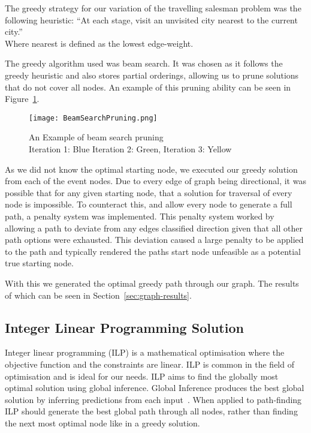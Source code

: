 \documentclass[bsc,frontabs,twoside,singlespacing,parskip,deptreport]{infthesis}     %
\begin{document}
The greedy strategy for our variation of the travelling salesman problem was the following heuristic:
``At each stage, visit an unvisited city nearest to the current city.''\\
Where nearest is defined as the lowest edge-weight.


The greedy algorithm used was beam search.
It was chosen as it follows the greedy heuristic and also stores partial orderings,
allowing us to prune solutions that do not cover all nodes.
An example of this pruning ability can be seen in Figure~\ref{fig:beam-prune}.

\begin{figure}[H]
  \centering
  \texttt{[image: BeamSearchPruning.png]}
  \caption{An Example of beam search pruning\\ Iteration 1: Blue Iteration 2: Green, Iteration 3: Yellow}
  \label{fig:beam-prune}
\end{figure}

As we did not know the optimal starting node, we executed our greedy solution from each of the event nodes.
Due to every edge of graph being directional, it was possible that for any given starting node, that a solution for traversal
of every node is impossible. To counteract this, and allow every node to generate a full path, a penalty system was implemented.
This penalty system worked by allowing a path to deviate from any edges classified direction given that all other path options
were exhausted. This deviation caused a large penalty to be applied to the path and typically rendered the paths start node
unfeasible as a potential true starting node. 

With this we generated the optimal greedy path through our graph. The results of which can be seen in Section~\ref{sec:graph-results}.

\subsection{Integer Linear Programming Solution}
Integer linear programming (ILP) is a mathematical optimisation where the objective function and the constraints are linear.
ILP is common in the field of optimisation and is ideal for our needs. ILP aims to find the globally most optimal solution using global inference.
Global Inference produces the best global solution by inferring predictions from each input~\cite{roth2004linear}.%
When applied to path-finding ILP should generate the best global path through all nodes, rather than finding the next most optimal node like in a greedy solution.
\end{document}
